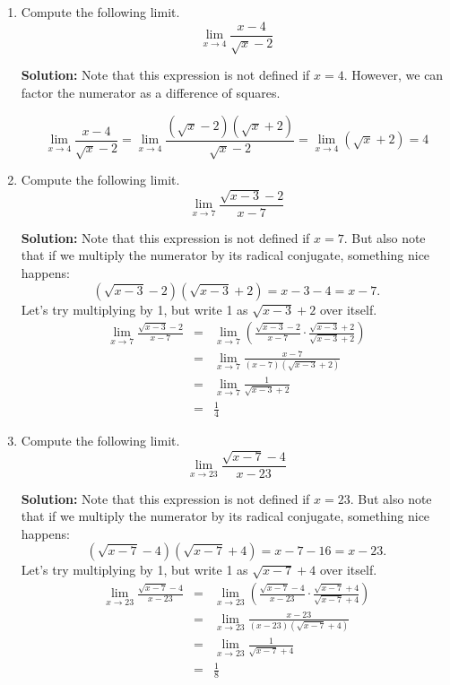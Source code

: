 \documentclass{article}
\begin{document}
\begin{enumerate}
  
\vspace{1cm}

\item Compute the following limit. \[ \lim_{x \rightarrow 4} \frac{x - 4}{\sqrt{x} - 2} \]

\textbf{Solution:} Note that this expression is not defined if $x = 4$. However, we can factor the numerator as a difference of squares.

\[ \lim_{x \rightarrow 4} \frac{x - 4}{\sqrt{x} - 2} = \lim_{x \rightarrow 4} \frac{(\sqrt{x} - 2)(\sqrt{x} + 2)}{\sqrt{x} - 2} = \lim_{x \rightarrow 4} (\sqrt{x} + 2) = 4 \]


  
\vspace{1cm}

\item Compute the following limit. \[ \lim_{x \rightarrow 7} \frac{\sqrt{x - 3} - 2}{x - 7} \]

\textbf{Solution:} Note that this expression is not defined if $x = 7$. But also note that if we multiply the numerator by its radical conjugate, something nice happens:
\[ \left(\sqrt{x - 3} - 2\right)\left(\sqrt{x - 3} + 2\right) = x - 3 - 4 = x - 7. \]
Let's try multiplying by 1, but write 1 as $\sqrt{x - 3} + 2$ over itself.
\begin{eqnarray*}
\lim_{x \rightarrow 7} \frac{\sqrt{x - 3} - 2}{x - 7} & = & \lim_{x \rightarrow 7} \left( \frac{\sqrt{x - 3} - 2}{x - 7} \cdot \frac{\sqrt{x - 3} + 2}{\sqrt{x - 3} + 2} \right) \\
 & = & \lim_{x \rightarrow 7} \frac{x - 7}{(x - 7)(\sqrt{x - 3} + 2)} \\
 & = & \lim_{x \rightarrow 7} \frac{1}{\sqrt{x - 3} + 2} \\
 & = & \frac{1}{4}
\end{eqnarray*}


  
\vspace{1cm}

\item Compute the following limit. \[ \lim_{x \rightarrow 23} \frac{\sqrt{x - 7} - 4}{x - 23} \]

\textbf{Solution:} Note that this expression is not defined if $x = 23$. But also note that if we multiply the numerator by its radical conjugate, something nice happens:
\[ \left(\sqrt{x - 7} - 4\right)\left(\sqrt{x - 7} + 4\right) = x - 7 - 16 = x - 23. \]
Let's try multiplying by 1, but write 1 as $\sqrt{x - 7} + 4$ over itself.
\begin{eqnarray*}
\lim_{x \rightarrow 23} \frac{\sqrt{x - 7} - 4}{x - 23} & = & \lim_{x \rightarrow 23} \left( \frac{\sqrt{x - 7} - 4}{x - 23} \cdot \frac{\sqrt{x - 7} + 4}{\sqrt{x - 7} + 4} \right) \\
 & = & \lim_{x \rightarrow 23} \frac{x - 23}{(x - 23)(\sqrt{x - 7} + 4)} \\
 & = & \lim_{x \rightarrow 23} \frac{1}{\sqrt{x - 7} + 4} \\
 & = & \frac{1}{8}
\end{eqnarray*}



\end{enumerate}
\end{document}
